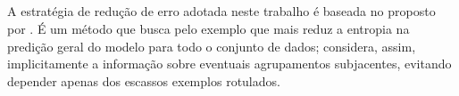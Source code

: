 % 

% 


\subsection{\Eer}
A estratégia de redução de erro adotada neste trabalho é baseada no
 proposto por
\cite{conf/ijcai/GuoG07}.
É um método que busca pelo exemplo que mais reduz a entropia na predição geral
do modelo para todo o conjunto de dados;
considera, assim, implicitamente a informação sobre eventuais agrupamentos subjacentes,
evitando depender apenas dos escassos exemplos rotulados.

